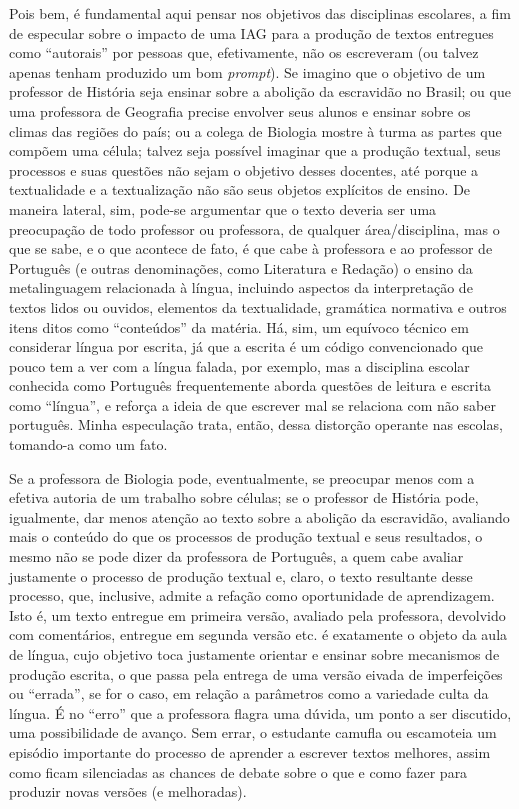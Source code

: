 \documentclass[portuguese]{textolivre}
\begin{document}
Pois bem, é fundamental aqui pensar nos objetivos das disciplinas escolares, a fim de especular sobre o impacto de uma IAG para a produção de textos entregues como ``autorais'' por pessoas que, efetivamente, não os escreveram (ou talvez apenas tenham produzido um bom \textit{prompt}). Se imagino que o objetivo de um professor de História seja ensinar sobre a abolição da escravidão no Brasil; ou que uma professora de Geografia precise envolver seus alunos e ensinar sobre os climas das regiões do país; ou a colega de Biologia mostre à turma as partes que compõem uma célula; talvez seja possível imaginar que a produção textual, seus processos e suas questões não sejam o objetivo desses docentes, até porque a textualidade e a textualização não são seus objetos explícitos de ensino. De maneira lateral, sim, pode-se argumentar que o texto deveria ser uma preocupação de todo professor ou professora, de qualquer área/disciplina, mas o que se sabe, e o que acontece de fato, é que cabe à professora e ao professor de Português (e outras denominações, como Literatura e Redação) o ensino da metalinguagem relacionada à língua, incluindo aspectos da interpretação de textos lidos ou ouvidos, elementos da textualidade, gramática normativa e outros itens ditos como ``conteúdos'' da matéria. Há, sim, um equívoco técnico em considerar língua por escrita, já que a escrita é um código convencionado que pouco tem a ver com a língua falada, por exemplo, mas a disciplina escolar conhecida como Português frequentemente aborda questões de leitura e escrita como ``língua'', e reforça a ideia de que escrever mal se relaciona com não saber português. Minha especulação trata, então, dessa distorção operante nas escolas, tomando-a como um fato.

Se a professora de Biologia pode, eventualmente, se preocupar menos com a efetiva autoria de um trabalho sobre células; se o professor de História pode, igualmente, dar menos atenção ao texto sobre a abolição da escravidão, avaliando mais o conteúdo do que os processos de produção textual e seus resultados, o mesmo não se pode dizer da professora de Português, a quem cabe avaliar justamente o processo de produção textual e, claro, o texto resultante desse processo, que, inclusive, admite a refação como oportunidade de aprendizagem. Isto é, um texto entregue em primeira versão, avaliado pela professora, devolvido com comentários, entregue em segunda versão etc. é exatamente o objeto da aula de língua, cujo objetivo toca justamente orientar e ensinar sobre mecanismos de produção escrita, o que passa pela entrega de uma versão eivada de imperfeições ou ``errada'', se for o caso, em relação a parâmetros como a variedade culta da língua. É no ``erro'' que a professora flagra uma dúvida, um ponto a ser discutido, uma possibilidade de avanço. Sem errar, o estudante camufla ou escamoteia um episódio importante do processo de aprender a escrever textos melhores, assim como ficam silenciadas as chances de debate sobre o que e como fazer para produzir novas versões (e melhoradas).
\end{document}
